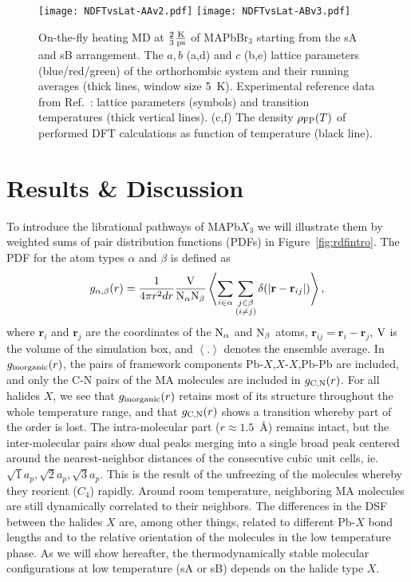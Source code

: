 \documentclass[journal=jpccck,manuscript=article,layout=twocolumn]{achemso}
\begin{document}
\begin{figure}[!t]
    \begin{center}
    \texttt{[image: NDFTvsLat-AAv2.pdf]}
    \texttt{[image: NDFTvsLat-ABv3.pdf]}
    \end{center}
   \caption{On-the-fly heating MD at $\frac{2}{3}\frac{\rm K}{\rm ps}$ of MAPbBr$_3$ starting from the sA and sB arrangement. The $a,b$ (a,d) and $c$ (b,e) lattice parameters (blue/red/green) of the orthorhombic system and their running averages (thick lines, window size 5~K). Experimental reference data from Ref.~\cite{Swainson:jssc03}: lattice parameters (symbols) and transition temperatures (thick vertical lines). (c,f) The density $\rho_{\rm FP}(T)$ of performed DFT calculations as function of temperature (black line).}
\label{fig:NDFT}
\end{figure}
\section{Results \&{} Discussion}

To introduce the librational pathways of MAPb$X_3$ we will illustrate them by weighted sums of pair distribution functions (PDFs) in Figure~\ref{fig:rdfintro}. The PDF for the atom types $\alpha$ and $\beta$ is defined as
\begin{equation*}
 g_{\alpha,\beta}(r)=\frac{1}{4\pi r^2dr}\frac{{\rm V}}{{\rm N}_\alpha {\rm N}_\beta}\left <\sum_{i\in\alpha}\sum_{\substack{j\in\beta \\(i\ne j)}}\delta(|\mathbf{r}-\mathbf{r}_{ij}|)\right > ,
\end{equation*}
where $\mathbf{r}_i$ and $\mathbf{r}_j$ are the coordinates of the ${\rm N}_\alpha$ and ${\rm N}_\beta$ atoms, $\mathbf{r}_{ij}=\mathbf{r}_i-\mathbf{r}_j$, $\rm V$ is the volume of the simulation box, and $\left< .\right >$ denotes the ensemble average. In $g_{\rm inorganic}(r)$, the pairs of framework components Pb-$X$,$X$-$X$,Pb-Pb are included, and only the C-N pairs of the MA molecules are included in $g_{\rm C,N}(r)$. For all halides $X$, we see that $g_{\rm inorganic}(r)$ retains most of its structure throughout the whole temperature range, and that $g_{\rm C,N}(r)$ shows a transition whereby part of the order is lost. The intra-molecular part ($r\approx{}1.5$~\AA) remains intact, but the inter-molecular pairs show dual peaks merging into a single broad peak centered around the nearest-neighbor distances of the consecutive cubic unit cells, ie. $\sqrt{1}a_p,\sqrt{2}a_p,\sqrt{3}a_p$. This is the result of the unfreezing of the molecules whereby they reorient ($C_4$) rapidly\cite{Onoda-Yamamuro:jpcs90}. Around room temperature, neighboring MA molecules are still dynamically correlated to their neighbors\cite{Lahnsteiner:prb16}. The differences in the DSF between the halides $X$ are, among other things, related to different Pb-$X$ bond lengths and to the relative orientation of the molecules in the low temperature phase. As we will show hereafter, the thermodynamically stable molecular configurations at low temperature (sA or sB) depends on the halide type $X$. 
\end{document}
